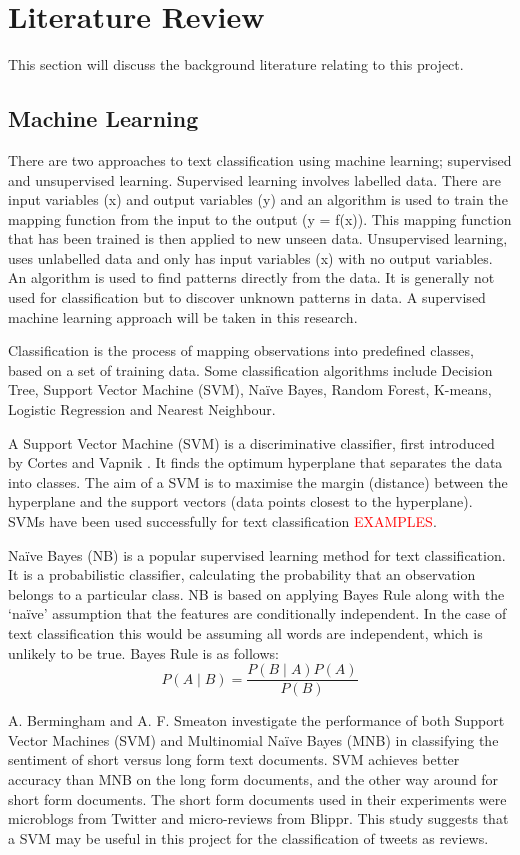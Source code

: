 \chapter{Literature Review}
This section will discuss the background literature relating to this project.

\section{Machine Learning}
There are two approaches to text classification using machine learning; supervised and unsupervised learning. Supervised learning involves labelled data. There are input variables (x) and output variables (y) and an algorithm is used to train the mapping function from the input to the output (y = f(x)). This mapping function that has been trained is then applied to new unseen data. Unsupervised learning, uses unlabelled data and only has input variables (x) with no output variables. An algorithm is used to find patterns directly from the data. It is generally not used for classification but to discover unknown patterns in data. A supervised machine learning approach will be taken in this research.

Classification is the process of mapping observations into predefined classes, based on a set of training data. Some classification algorithms include Decision Tree, Support Vector Machine (SVM), Naïve Bayes, Random Forest, K-means, Logistic Regression and Nearest Neighbour.

A Support Vector Machine (SVM) is a discriminative classifier, first introduced by Cortes and Vapnik \cite{Vapnik1995,Vapnik21995}. It finds the optimum hyperplane that separates the data into classes. The aim of a SVM is to maximise the margin (distance) between the hyperplane and the support vectors (data points closest to the hyperplane). SVMs have been used successfully for text classification \textcolor{red}{EXAMPLES}.

Naïve Bayes (NB) is a popular supervised learning method for text classification. It is a probabilistic classifier, calculating the probability that an observation belongs to a particular class. NB is based on applying Bayes Rule along with the ‘naïve’ assumption that the features are conditionally independent. In the case of text classification this would be assuming all words are independent, which is unlikely to be true. Bayes Rule is as follows:  \[P(A\mid B)=\frac{P(B\mid A)P(A)}{P(B)}\]

A. Bermingham and A. F. Smeaton \cite{Berm2010} investigate the performance of both Support Vector Machines (SVM) and Multinomial Naïve Bayes (MNB) in classifying the sentiment of short versus long form text documents. SVM achieves better accuracy than MNB on the long form documents, and the other way around for short form documents. The short form documents used in their experiments were microblogs from Twitter and micro-reviews from Blippr. This study suggests that a SVM may be useful in this project for the classification of tweets as reviews.

